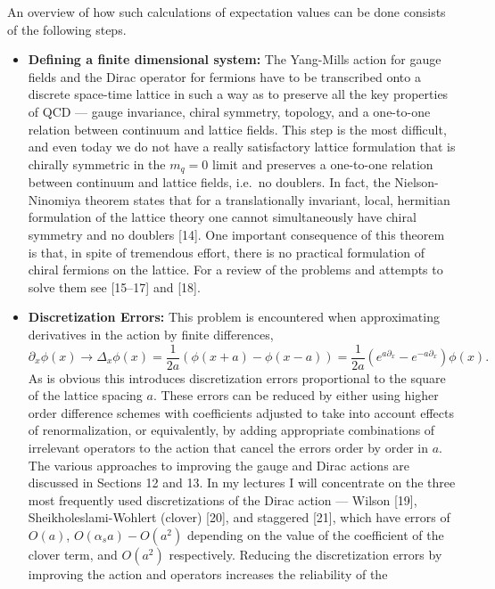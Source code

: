 An overview of how such calculations of expectation values can be done
consists of the following steps.
\begin{itemize}
  \item \textbf{Defining a finite dimensional system:} The Yang-Mills action for gauge
    fields and the Dirac operator for fermions have to be transcribed onto a discrete space-time lattice in such a way as to preserve all the key properties
    of QCD --- gauge invariance, chiral symmetry, topology, and a one-to-one
    relation between continuum and lattice fields. This step is the most difficult, and even today we do not have a really satisfactory lattice formulation
    that is chirally symmetric in the $m_q = 0$ limit and preserves a one-to-one
    relation between continuum and lattice fields, i.e.\ no doublers. In fact, the
    Nielson-Ninomiya theorem states that for a translationally invariant, local,
    hermitian formulation of the lattice theory one cannot simultaneously have
    chiral symmetry and no doublers [14]. One important consequence of this
    theorem is that, in spite of tremendous effort, there is no practical formulation of chiral fermions on the lattice. For a review of the problems and
    attempts to solve them see [15--17] and [18].
  \item \textbf{Discretization Errors:} This problem is encountered when approximating
    derivatives in the action by finite differences,
    \begin{equation}
      \partial_x \phi(x) \to \Delta_x \phi(x)
      = \frac{1}{2a}\left( \phi(x + a) - \phi(x - a) \right)
      = \frac{1}{2a}\left( e^{a\partial_x} - e^{-a\partial_x} \right)\phi(x).
      \label{eq:derivative}
    \end{equation}
    As is obvious this introduces discretization errors proportional to the square
    of the lattice spacing $a$. These errors can be reduced by either using higher
    order difference schemes with coefficients adjusted to take into account
    effects of renormalization, or equivalently, by adding appropriate combinations of irrelevant operators to the action that cancel the errors order by order in $a$. The various approaches to improving the gauge and Dirac actions
    are discussed in Sections 12 and 13. In my lectures I will concentrate on
    the three most frequently used discretizations of the Dirac action --- Wilson
    [19], Sheikholeslami-Wohlert (clover) [20], and staggered [21], which have
    errors of $O(a)$, $O(\alpha_s a) - O(a^2)$ depending on the value of the coefficient
    of the clover term, and $O(a^2)$ respectively. Reducing the discretization errors by improving the action and operators increases the reliability of the

\end{itemize}
